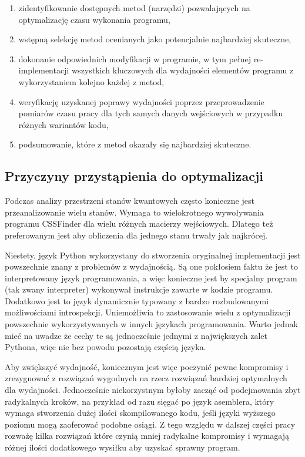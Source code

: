 \documentclass[11pt, a4paper]{article}
\begin{document}
\begin{sloppypar}
\begin{enumerate}
      \item zidentyfikowanie dostępnych metod (narzędzi) pozwalających na optymalizację czasu
        wykonania programu,

      \item wstępną selekcję metod ocenianych jako potencjalnie najbardziej skuteczne,

      \item dokonanie odpowiednich modyfikacji w programie, w tym pełnej re-implementacji
        wszystkich kluczowych dla wydajności elementów programu z wykorzystaniem kolejno
        każdej z metod,

      \item weryfikację uzyskanej poprawy wydajności poprzez przeprowadzenie pomiarów czasu
        pracy dla tych samych danych wejściowych w przypadku różnych wariantów kodu,

      \item podsumowanie, które z metod okazały się najbardziej skuteczne.
    \end{enumerate}

    \subsection{Przyczyny przystąpienia do optymalizacji}
    Podczas analizy przestrzeni stanów kwantowych często konieczne jest przeanalizowanie
    wielu stanów. Wymaga to wielokrotnego wywoływania programu CSSFinder dla wielu różnych
    macierzy wejściowych. Dlatego też preferowanym jest aby obliczenia dla jednego stanu
    trwały jak najkrócej.

    Niestety, język Python wykorzystany do stworzenia oryginalnej implementacji jest powszechnie
    znany z problemów z wydajnością\cite{srinath2017python}. Są one pokłosiem faktu że jest
    to interpretowany język programowania, a więc konieczne jest by specjalny program (tak
    zwany interpreter) wykonywał instrukcje zawarte w kodzie programu. Dodatkowo jest to
    język dynamicznie typowany z bardzo rozbudowanymi możliwościami introspekcji.
    Uniemożliwia to zastosowanie wielu z optymalizacji powszechnie wykorzystywanych w
    innych językach programowania. Warto jednak mieć na uwadze że cechy te są jednocześnie
    jednymi z największych zalet Pythona, więc nie bez powodu pozostają częścią języka.

    Aby zwiększyć wydajność, koniecznym jest więc poczynić pewne kompromisy i zrezygnować
    z rozwiązań wygodnych na rzecz rozwiązań bardziej optymalnych dla wydajności.
    Jednocześnie niekorzystnym byłoby zacząć od podejmowania zbyt radykalnych kroków, na
    przykład od razu sięgać po język asemblera, który wymaga stworzenia dużej ilości
    skompilowanego kodu, jeśli języki wyższego poziomu mogą zaoferować podobne osiągi. Z
    tego względu w dalszej części pracy rozważę kilka rozwiązań które czynią mniej
    radykalne kompromisy i wymagają różnej ilości dodatkowego wysiłku aby uzyskać
    sprawny program.


\end{sloppypar}
\end{document}
